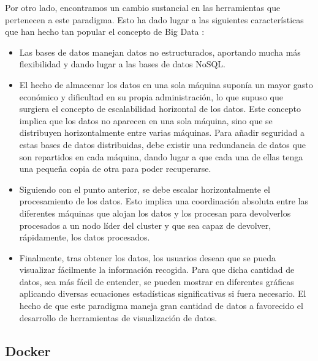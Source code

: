 Por otro lado, encontramos un cambio sustancial en las herramientas que pertenecen a este paradigma. Esto ha dado lugar a las siguientes características que han hecho tan popular el concepto de Big Data \cite{BD-6}:

\begin{itemize}
        \item Las bases de datos manejan datos no estructurados, aportando mucha más flexibilidad y dando lugar a las bases de datos NoSQL.
        \item El hecho de almacenar los datos en una sola máquina suponía un mayor gasto económico y dificultad en su propia administración, lo que supuso que surgiera el concepto de escalabilidad horizontal de los datos. Este concepto implica que los datos no aparecen en una sola máquina, sino que se distribuyen horizontalmente entre varias máquinas. Para añadir seguridad a estas bases de datos distribuidas, debe existir una redundancia de datos que son repartidos en cada máquina, dando lugar a que cada una de ellas tenga una pequeña copia de otra para poder recuperarse.
        \item Siguiendo con el punto anterior, se debe escalar horizontalmente el procesamiento de los datos. Esto implica una coordinación absoluta entre las diferentes máquinas que alojan los datos y los procesan para devolverlos procesados a un nodo líder del cluster y que sea capaz de devolver, rápidamente, los datos procesados.
        \item Finalmente, tras obtener los datos, los usuarios desean que se pueda visualizar fácilmente la información recogida. Para que dicha cantidad de datos, sea más fácil de entender, se pueden mostrar en diferentes gráficas aplicando diversas ecuaciones estadísticas significativas si fuera necesario. El hecho de que este paradigma maneja gran cantidad de datos a favorecido el desarrollo de herramientas de visualización de datos.
\end{itemize}

\subsection{Docker\label{Docker}}



